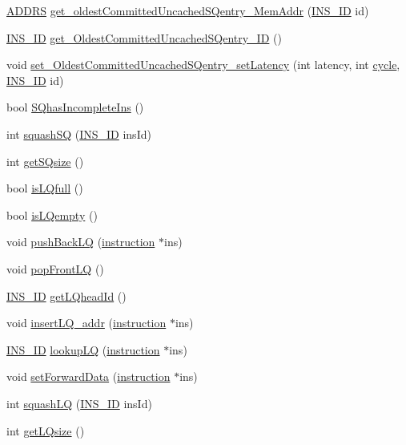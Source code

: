 \begin{DoxyCompactItemize}
\item 
\hyperlink{global_2global_8h_a7ea74bb9ffd2e4d41550ae2383dd25bc}{ADDRS} \hyperlink{classlsq_ad7a4b49b4bd82e13bc8b7ab99e94ac93}{get\_\-oldestCommittedUncachedSQentry\_\-MemAddr} (\hyperlink{global_2global_8h_a1883c47d0023d0f200e1d86eced6a070}{INS\_\-ID} id)
\item 
\hyperlink{global_2global_8h_a1883c47d0023d0f200e1d86eced6a070}{INS\_\-ID} \hyperlink{classlsq_a20508e015abc2e6d9d9cc5a7aa71e66d}{get\_\-OldestCommittedUncachedSQentry\_\-ID} ()
\item 
void \hyperlink{classlsq_a330107fe2884a0e3f0b7d5bdfb457a14}{set\_\-OldestCommittedUncachedSQentry\_\-setLatency} (int latency, int \hyperlink{vliwScheduler_8cpp_a1f4871d45089b039d95d3832dd123827}{cycle}, \hyperlink{global_2global_8h_a1883c47d0023d0f200e1d86eced6a070}{INS\_\-ID} id)
\item 
bool \hyperlink{classlsq_a6cef821f12c3616018959338e23a8578}{SQhasIncompleteIns} ()
\item 
int \hyperlink{classlsq_ac4c427683d9be2a048a1d843a6f5b3a2}{squashSQ} (\hyperlink{global_2global_8h_a1883c47d0023d0f200e1d86eced6a070}{INS\_\-ID} insId)
\item 
int \hyperlink{classlsq_a6ead3324d0ec847b50ad6bf8a460aa83}{getSQsize} ()
\item 
bool \hyperlink{classlsq_af9716eece00fa2c3782af7eac2584f56}{isLQfull} ()
\item 
bool \hyperlink{classlsq_a4f8f0a8bc6315319a749384b78ccdfe7}{isLQempty} ()
\item 
void \hyperlink{classlsq_afd8f458e37a4132439d67b346950e7b8}{pushBackLQ} (\hyperlink{classinstruction}{instruction} $\ast$ins)
\item 
void \hyperlink{classlsq_a07cc87b52ca829c2c3cd3fe89eadec14}{popFrontLQ} ()
\item 
\hyperlink{global_2global_8h_a1883c47d0023d0f200e1d86eced6a070}{INS\_\-ID} \hyperlink{classlsq_a7ce41db29b4e1dedeb1ed4342f4cd8f8}{getLQheadId} ()
\item 
void \hyperlink{classlsq_a34c826839b11b966e3f0c27f43168f99}{insertLQ\_\-addr} (\hyperlink{classinstruction}{instruction} $\ast$ins)
\item 
\hyperlink{global_2global_8h_a1883c47d0023d0f200e1d86eced6a070}{INS\_\-ID} \hyperlink{classlsq_adcfc80bd04c62a423991ac914d5d2454}{lookupLQ} (\hyperlink{classinstruction}{instruction} $\ast$ins)
\item 
void \hyperlink{classlsq_ae1c6ebc9bb617e8076b1f53feaa734ff}{setForwardData} (\hyperlink{classinstruction}{instruction} $\ast$ins)
\item 
int \hyperlink{classlsq_af5c64a015fd83b47c632f67358b10cf6}{squashLQ} (\hyperlink{global_2global_8h_a1883c47d0023d0f200e1d86eced6a070}{INS\_\-ID} insId)
\item 
int \hyperlink{classlsq_a1df6ccddeb9b7461b87af3629294f179}{getLQsize} ()
\end{DoxyCompactItemize}


